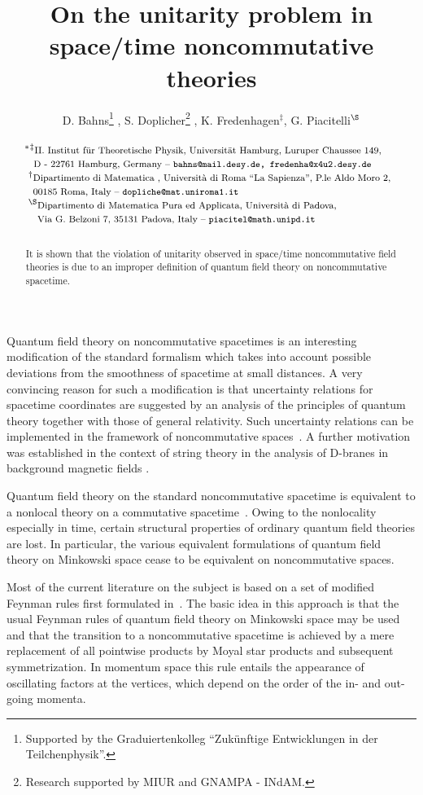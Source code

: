 \documentclass[a4paper,twoside,12pt]{article}
\title{\bf On the unitarity problem in space/time noncommutative theories}
\author{D. Bahns\thanks{Supported by the Graduiertenkolleg ``Zuk\"unftige Entwicklungen in der Teilchenphysik''.} , 
S. Doplicher\thanks{Research supported by MIUR and GNAMPA - INdAM.} , 
K. Fredenhagen$^\ddag$, G. Piacitelli$^\S$
\\\\
$
\begin{array}{l}
\!\!\phantom{ }^* \phantom{ }^\ddag
\mbox{{\footnotesize II. Institut f\"ur Theoretische Physik, Universit\"at
Hamburg, Luruper Chaussee 149, }}
\\ \phantom{^*}\mbox{{\footnotesize D - 22761 Hamburg, Germany --
 {\tt bahns@mail.desy.de, fredenha@x4u2.desy.de}}}
\\^\dagger\mbox{{\footnotesize Dipartimento di Matematica
, Universit\`a di Roma ``La Sapienza'',
P.le Aldo Moro 2, }}
\\\phantom{^\dag}\mbox{{\footnotesize 00185 Roma, Italy --{
\tt dopliche@mat.uniroma1.it}}}
\\^\S\mbox{{\footnotesize Dipartimento di Matematica Pura ed Applicata,
Universit\`a di Padova,}} 
\\\phantom{^\S}\mbox{{\footnotesize  
Via G. Belzoni 7, 35131 Padova, Italy -- {\tt piacitel@math.unipd.it}}}
\end{array}$}
\date{}
\begin{document}
\maketitle


\begin{abstract}
\noindent It is shown that the violation of unitarity observed in space/time
noncommutative field theories is due to an improper definition of quantum field
theory on noncommutative spacetime.
\end{abstract}

\noindent Quantum field theory on noncommutative spacetimes is an interesting
modification of the standard formalism which takes into account possible
deviations from the smoothness of spacetime at small distances.  A very
convincing reason for such a modification is that uncertainty relations for
spacetime coordinates are suggested by an analysis of the principles of quantum
theory together with those of general relativity. Such uncertainty relations
can be implemented in the framework of noncommutative spaces~\cite{dfr}. A
further motivation was established in the context of string theory in the
analysis of D-branes in background magnetic fields \cite{schomerus}.

Quantum field theory on the standard noncommutative spacetime is equivalent to
a nonlocal theory on a commutative spacetime~\cite[$\!\!\S$ \,6]{dfr}. Owing to
the nonlocality especially in time, certain structural properties of ordinary
quantum field theories are lost. In particular, the various equivalent
formulations of quantum field theory on Minkowski space cease to be equivalent
on noncommutative spaces.

Most of the current literature on the subject is based on a set of modified
Feynman rules first formulated in~\cite{filk}. The basic idea in this
approach is that the usual Feynman rules of quantum field theory on Minkowski
space may be used and that the transition to a noncommutative spacetime is
achieved by a mere replacement of all pointwise products by Moyal
star products and subsequent symmetrization. In momentum space this rule
entails the appearance of oscillating factors at the vertices, which depend on
the order of the in- and out-going momenta.
\end{document}
